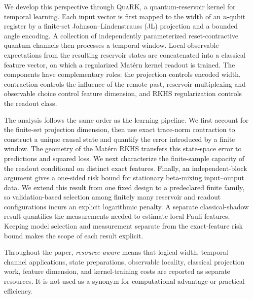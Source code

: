 We develop this perspective through \textsc{QuaRK}, a quantum-reservoir kernel
for temporal learning. Each input vector is first mapped to the width of an
\(n\)-qubit register by a finite-set Johnson--Lindenstrauss (JL) projection and
a bounded angle encoding. A collection of independently parameterized
reset-contractive quantum channels then processes a temporal window. Local
observable expectations from the resulting reservoir states are concatenated
into a classical feature vector, on which a regularized Mat\'ern kernel readout
is trained. The components have complementary roles: the projection controls
encoded width, contraction controls the influence of the remote past,
reservoir multiplexing and observable choice control feature dimension, and
RKHS regularization controls the readout class.

The analysis follows the same order as the learning pipeline. We first account
for the finite-set projection dimension, then use exact trace-norm contraction
to construct a unique causal state and quantify the error introduced by a
finite window. The geometry of the Mat\'ern RKHS transfers this state-space
error to predictions and squared loss. We next characterize the finite-sample
capacity of the readout conditional on distinct exact features. Finally, an
independent-block argument gives a one-sided risk bound for stationary
beta-mixing input--output data. We extend this result from one fixed design to
a predeclared finite family, so validation-based selection among finitely many
reservoir and readout configurations incurs an explicit logarithmic penalty.
A separate classical-shadow result quantifies the measurements needed to
estimate local Pauli features. Keeping model selection and measurement
separate from the exact-feature risk bound makes the scope of each result
explicit.

Throughout the paper, \emph{resource-aware} means that logical width, temporal
channel applications, state preparations, observable locality, classical
projection work, feature dimension, and kernel-training costs are reported as
separate resources. It is not used as a synonym for computational advantage or
practical efficiency.

